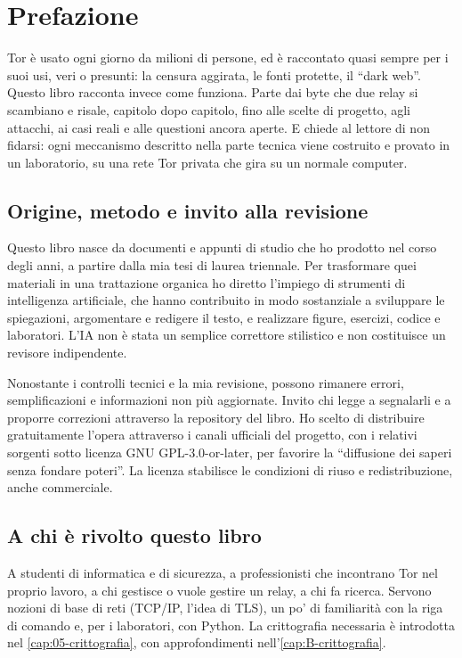 \chapter{Prefazione}

Tor è usato ogni giorno da milioni di persone, ed è raccontato quasi sempre per i suoi usi, veri o presunti: la censura aggirata, le fonti protette, il \enquote{dark web}. Questo libro racconta invece come funziona. Parte dai byte che due relay si scambiano e risale, capitolo dopo capitolo, fino alle scelte di progetto, agli attacchi, ai casi reali e alle questioni ancora aperte. E chiede al lettore di non fidarsi: ogni meccanismo descritto nella parte tecnica viene costruito e provato in un laboratorio, su una rete Tor privata che gira su un normale computer.

\section*{Origine, metodo e invito alla revisione}

Questo libro nasce da documenti e appunti di studio che ho prodotto nel corso degli anni, a partire dalla mia tesi di laurea triennale. Per trasformare quei materiali in una trattazione organica ho diretto l'impiego di strumenti di intelligenza artificiale, che hanno contribuito in modo sostanziale a sviluppare le spiegazioni, argomentare e redigere il testo, e realizzare figure, esercizi, codice e laboratori. L'IA non è stata un semplice correttore stilistico e non costituisce un revisore indipendente.

Nonostante i controlli tecnici e la mia revisione, possono rimanere errori, semplificazioni e informazioni non più aggiornate. Invito chi legge a segnalarli e a proporre correzioni attraverso la repository del libro. Ho scelto di distribuire gratuitamente l'opera attraverso i canali ufficiali del progetto, con i relativi sorgenti sotto licenza GNU GPL-3.0-or-later, per favorire la \enquote{diffusione dei saperi senza fondare poteri}. La licenza stabilisce le condizioni di riuso e redistribuzione, anche commerciale.

\section*{A chi è rivolto questo libro}

A studenti di informatica e di sicurezza, a professionisti che incontrano Tor nel proprio lavoro, a chi gestisce o vuole gestire un relay, a chi fa ricerca. Servono nozioni di base di reti (TCP/IP, l'idea di TLS), un po' di familiarità con la riga di comando e, per i laboratori, con Python. La crittografia necessaria è introdotta nel \cref{cap:05-crittografia}, con approfondimenti nell'\cref{cap:B-crittografia}.

